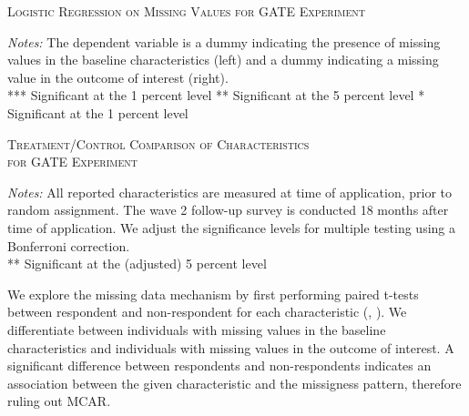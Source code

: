 \begin{table}[t!]
\centering
\caption{\textsc{Logistic Regression on Missing Values for GATE Experiment}}
\begin{adjustbox}{width=\textwidth,totalheight=\textheight,keepaspectratio}

\end{adjustbox}


\label{tab:table_logistic}
\medskip
\raggedright
\footnotesize
\textit{Notes:} The dependent variable is a dummy indicating the presence of missing values in the baseline characteristics (left) and a dummy indicating a missing value in the outcome of interest (right). \\
*** Significant at the 1 percent level ** Significant at the 5 percent level * Significant at the 1 percent level
\end{table}

\begin{table}[t!]
\centering
\caption{\textsc{Treatment/Control Comparison of Characteristics \\ for GATE Experiment}}
\begin{adjustbox}{width=\textwidth, totalheight=\textheight, keepaspectratio}

\end{adjustbox}


\label{tab:table_integrity}
\medskip
\raggedright
\footnotesize
\textit{Notes:} All reported characteristics are measured at time of application, prior to random assignment. The wave 2 follow-up survey is conducted 18 months after time of application. We adjust the significance levels for multiple testing using a Bonferroni correction. \\
** Significant at the (adjusted) 5 percent level
\end{table}

We explore the missing data mechanism by first performing paired t-tests between respondent and non-respondent for each characteristic (\cite{acock2005}, \cite{huisman1998}). We differentiate between individuals with missing values in the baseline characteristics and individuals with missing values in the outcome of interest. A significant difference between respondents and non-respondents indicates an association between the given characteristic and the missigness pattern, therefore ruling out MCAR.

